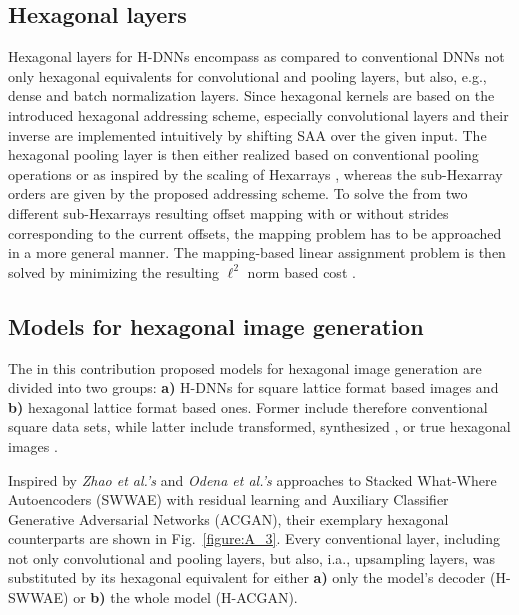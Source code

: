 \documentclass{article}
\begin{document}
\subsection{Hexagonal layers}

Hexagonal layers for H-DNNs encompass as compared to conventional DNNs not only hexagonal equivalents for convolutional and pooling layers, but also, e.g., dense and batch normalization layers. Since hexagonal kernels are based on the introduced hexagonal addressing scheme, especially convolutional layers and their inverse are implemented intuitively by shifting SAA over the given input. The hexagonal pooling layer is then either realized based on conventional pooling operations or as inspired by the scaling of Hexarrays \cite{Middleton2005}, whereas the sub-Hexarray orders are given by the proposed addressing scheme. To solve the from two different sub-Hexarrays resulting offset mapping with or without strides corresponding to the current offsets, the mapping problem has to be approached in a more general manner. The mapping-based linear assignment problem is then solved by minimizing the resulting $\ell^2$ norm based cost \cite{Schlosser2019}.


\subsection{Models for hexagonal image generation}

The in this contribution proposed models for hexagonal image generation are divided into two groups: \textbf{a)} H-DNNs for square lattice format based images and \textbf{b)} hexagonal lattice format based ones. Former include therefore conventional square data sets, while latter include transformed, synthesized \cite{Steppa2019}, or true hexagonal images \cite{Shilon2019}.

Inspired by \textit{Zhao et al.'s} \cite{Zhao2015} and \textit{Odena et al.'s} \cite{Odena2017} approaches to Stacked What-Where Autoencoders (SWWAE) with residual learning and Auxiliary Classifier Generative Adversarial Networks (ACGAN), their exemplary hexagonal counterparts are shown in Fig.~\ref{figure:A_3}. Every conventional layer, including not only convolutional and pooling layers, but also, i.a., upsampling layers, was substituted by its hexagonal equivalent for either \textbf{a)} only the model's decoder (H-SWWAE) or \textbf{b)} the whole model (H-ACGAN).
\end{document}
